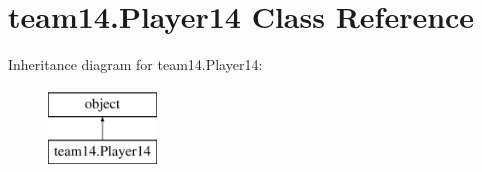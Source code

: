 \hypertarget{classteam14_1_1_player14}{}\section{team14.\+Player14 Class Reference}
\label{classteam14_1_1_player14}
Inheritance diagram for team14.\+Player14\+:\begin{figure}[H]
\begin{center}
\leavevmode
\includegraphics[height=2.000000cm]{classteam14_1_1_player14}
\end{center}
\end{figure}
